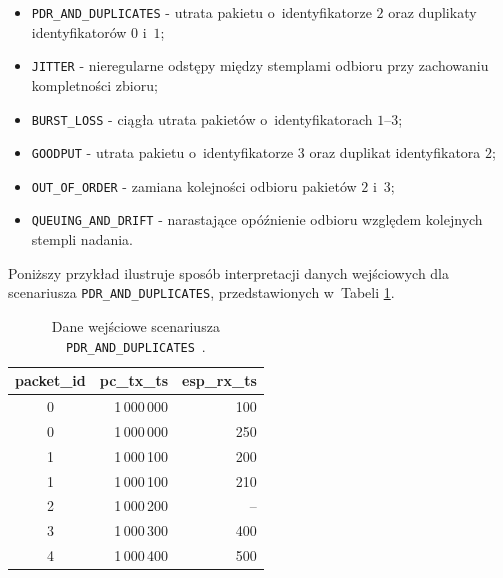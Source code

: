 \begin{itemize}
    \item \texttt{PDR\_AND\_DUPLICATES} - utrata pakietu o~identyfikatorze $2$ oraz duplikaty identyfikatorów $0$ i~$1$;
    \item \texttt{JITTER} - nieregularne odstępy między stemplami odbioru przy zachowaniu kompletności zbioru;
    \item \texttt{BURST\_LOSS} - ciągła utrata pakietów o~identyfikatorach $1$--$3$;
    \item \texttt{GOODPUT} - utrata pakietu o~identyfikatorze $3$ oraz duplikat identyfikatora $2$;
    \item \texttt{OUT\_OF\_ORDER} - zamiana kolejności odbioru pakietów $2$ i~$3$;
    \item \texttt{QUEUING\_AND\_DRIFT} - narastające opóźnienie odbioru względem kolejnych stempli nadania.
\end{itemize}

Poniższy przykład ilustruje sposób interpretacji danych wejściowych dla scenariusza \texttt{PDR\_AND\_DUPLICATES}, przedstawionych w~Tabeli \ref{tab:qos_mock_pdr_input}.

\begin{table}[htbp]
    \centering
    \caption{Dane wejściowe scenariusza \texttt{PDR\_AND\_DUPLICATES}~\cite{espy_nexus_python_host}.}
    \label{tab:qos_mock_pdr_input}
    \begin{tabular}{|c|r|r|}
        \hline
        \textbf{packet\_id} & \textbf{pc\_tx\_ts} & \textbf{esp\_rx\_ts} \\
        \hline
        0                   & 1\,000\,000         & 100                  \\
        0                   & 1\,000\,000         & 250                  \\
        1                   & 1\,000\,100         & 200                  \\
        1                   & 1\,000\,100         & 210                  \\
        2                   & 1\,000\,200         & --                   \\
        3                   & 1\,000\,300         & 400                  \\
        4                   & 1\,000\,400         & 500                  \\
        \hline
    \end{tabular}
\end{table}


